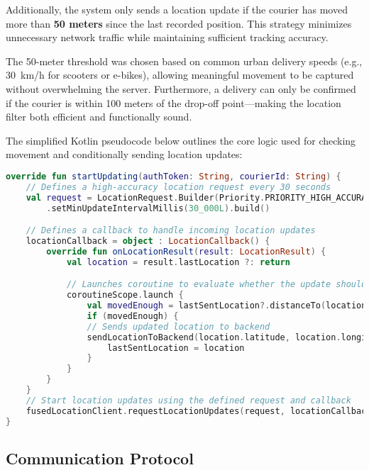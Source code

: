 Additionally, the system only sends a location update if the courier has moved more than \textbf{50 meters} since the last recorded position. This strategy minimizes unnecessary network traffic while maintaining sufficient tracking accuracy.

The 50-meter threshold was chosen based on common urban delivery speeds (e.g., 30~km/h for scooters or e-bikes), allowing meaningful movement to be captured without overwhelming the server. Furthermore, a delivery can only be confirmed if the courier is within 100 meters of the drop-off point—making the location filter both efficient and functionally sound.

The simplified Kotlin pseudocode below outlines the core logic used for checking movement and conditionally sending location updates:

\begin{lstlisting}[language=Kotlin, caption={Condensed Kotlin-style pseudocode for Courier location updates mechanism}]
override fun startUpdating(authToken: String, courierId: String) {
    // Defines a high-accuracy location request every 30 seconds
    val request = LocationRequest.Builder(Priority.PRIORITY_HIGH_ACCURACY, 30_000L)
        .setMinUpdateIntervalMillis(30_000L).build()

    // Defines a callback to handle incoming location updates
    locationCallback = object : LocationCallback() {
        override fun onLocationResult(result: LocationResult) {
            val location = result.lastLocation ?: return

            // Launches coroutine to evaluate whether the update should be sent or not
            coroutineScope.launch {
                val movedEnough = lastSentLocation?.distanceTo(location)?.let { it > MIN_DISTANCE_METERS } != false
                if (movedEnough) {
                // Sends updated location to backend
                sendLocationToBackend(location.latitude, location.longitude, courierId, authToken)
                    lastSentLocation = location
                }
            }
        }
    }
    // Start location updates using the defined request and callback
    fusedLocationClient.requestLocationUpdates(request, locationCallback!!, Looper.getMainLooper())
}
\end{lstlisting}



\subsection{Communication Protocol}

